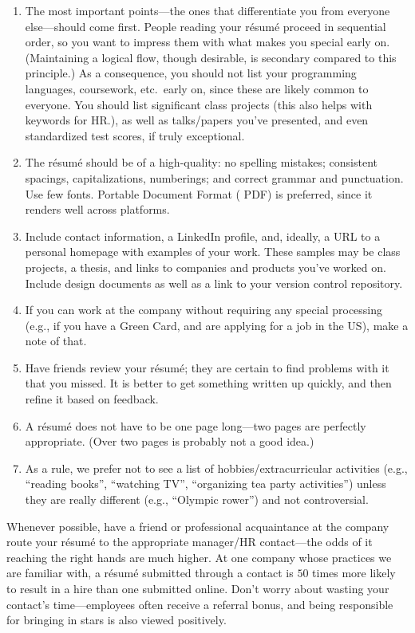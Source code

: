 \documentclass[10pt,openany,twoside,letterpaper,extrafontsizes]{memoir}
\newcommand{\myindex}[1]{%
\index[terms]{#1}%
}
\begin{document}
\begin{Spacing}{\gettingReadySpacing}
\begin{enumerate}[label=(\arabic*.), ref=(\arabic*.)]
\item The most important points---the ones that differentiate you from everyone else---should come
first. People reading your r\'{e}sum\'{e} proceed in sequential order, so you
want to impress them with what makes you special early on. (Maintaining a logical flow,
though desirable, is secondary compared to this principle.)
As a consequence, you should not list your programming languages, coursework, etc.~early
on, since these are likely common to everyone. You should list significant class projects
(this also helps with keywords for HR.), as well as talks/papers you've presented, and even
standardized test scores, if truly exceptional.
\item The r\'{e}sum\'{e} should be of a high-quality: no spelling mistakes;
consistent spacings, capitalizations, numberings; and correct grammar and punctuation.
Use few fonts. \myindex{Portable Document Format|see{PDF}}Portable Document Format (\myindex{PDF|textbf}PDF) is preferred, since it renders well
across platforms.
\item Include contact information, a LinkedIn profile, and, ideally, a \myindex{URL}URL to a personal homepage
with examples of your work. These samples may be class projects, a thesis, and
links to companies and products you've worked on. Include design documents as well
as a link to your version control repository.
\item  If you can work at the company without requiring any special processing
(e.g., if you have a Green Card, and are applying for a job in the US), make a
note of that.
\item Have friends review your r\'{e}sum\'{e}; they are certain to find
problems with it that you missed. It is better to
get something written up quickly, and then refine it based on feedback.
\item A r\'{e}sum\'{e} does not have to be one page long---two pages
are perfectly appropriate. (Over two pages is probably not a good idea.)
\item As a rule, we prefer not to see a list of hobbies/extracurricular activities
(e.g., ``reading books'', ``watching TV'', ``organizing tea party activities'')
unless they are really different (e.g., ``Olympic rower'') and not controversial.
\end{enumerate}
Whenever possible, have a friend or professional acquaintance at the company
\label{resume-submission}
route your r\'{e}sum\'{e} to the appropriate manager/HR contact---the odds of it
reaching the right hands are much higher.
At one company whose practices we are familiar with, a r\'{e}sum\'{e} submitted through a contact is
$50$ times more likely to result in a hire than one submitted online. Don't worry
about wasting your contact's time---employees often receive a referral bonus, and
being responsible for bringing in stars is also viewed positively.


\end{Spacing}
\end{document}

